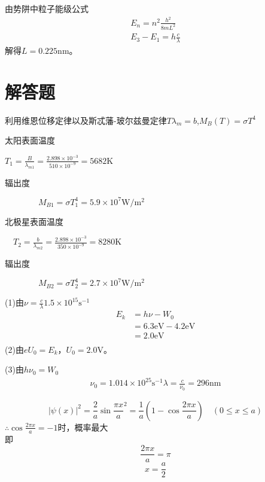 
\solve 由势阱中粒子能级公式
\begin{gather*}
	E_n=n^2\frac{h^2}{8mL^2}\\
	E_3-E_1=h\frac{c}{\lambda}
\end{gather*}
解得$L=0.225\mathrm{nm}$。

\section{解答题}

\exercise

\solve 利用维恩位移定律以及斯忒藩-玻尔兹曼定律$T\lambda_m=b$,$M_B(T)=\sigma T^4$

太阳表面温度 
\begin{center}$T_1=\frac{B}{\lambda_{m1}}=\frac{2.898\times10^{-3}}{510\times10^{-9}}=5682\mathrm{K}$\end{center}
辐出度
\begin{center}$\qquad\qquad M_{B1}=\sigma T_1^4=5.9\times10^7\mathrm{W/m^2}$\end{center}
北极星表面温度
\begin{center}$\quad T_2=\frac{b}{\lambda_{m2}}=\frac{2.898\times10^{-3}}{350\times10^{-9}}=8280\mathrm{K}$\end{center}
辐出度
\begin{center}$\qquad\qquad M_{B2}=\sigma T_2^4=2.7\times10^7\mathrm{W/m^2}$\end{center}

\exercise

\solve (1)由$\nu=\frac{c}{\lambda}1.5\times10^{15}\mathrm{s^{-1}}$
\begin{equation}\nonumber
\begin{split}
E_k&=h\nu-W_0\\
&=6.3\mathrm{eV}-4.2\mathrm{eV}\\
&=2.0\mathrm{eV}\\
\end{split}
\end{equation}
(2)由$eU_0=E_k$，$U_0=2.0\mathrm{V}$。

(3)由$h\nu_0=W_0$
\begin{gather*}
	\nu_0=1.014\times10^{25} \mathrm{s^{-1}}
	\lambda=\frac{c}{\nu_0}=296\mathrm{nm} 
\end{gather*}

\exercise

\solve 
\[ |\psi(x)|^2=\frac{2}{a}\sin{\frac{\pi x}{a}}^2=\frac{1}{a}(1-\cos{\frac{2\pi x}{a}}) \quad (0\le x \le a) \]
$\therefore \cos{\frac{2\pi x}{a}}=-1$时，概率最大\\
即
\[ \frac{2\pi x}{a}=\pi \]
\[ x=\frac{a}{2} \]
	
